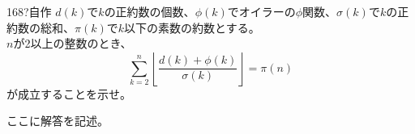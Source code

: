 \begin{thm}{168}{\hosi ?}{自作}
 $d(k)$で$k$の正約数の個数、$\phi(k)$でオイラーの$\phi$関数、$\sigma(k)$で$k$の正約数の総和、$\pi(k)$で$k$以下の素数の約数とする。 \\
 $n$が2以上の整数のとき、
 \[ \sum_{k=2}^n \left\lfloor \frac{d(k)+\phi(k)}{\sigma(k)} \right\rfloor = \pi(n) \]
 が成立することを示せ。
\end{thm}

ここに解答を記述。